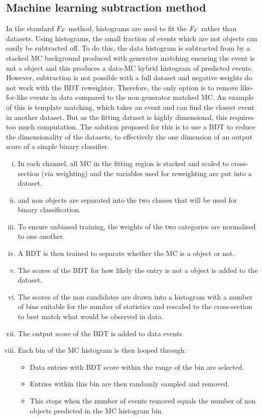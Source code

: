 \subsection{Machine learning subtraction method}

In the standard $F_{F}$ method, histograms are used to fit the $F_{F}$ rather than datasets. 
Using histograms, the small fraction of events which are not \jtth objects can easily be subtracted off. 
To do this, the data histogram is subtracted from by a stacked \ac{MC} background produced with generator matching ensuring the event is not a \jtth object and this produces a data-\ac{MC} hybrid histogram of predicted \jtth events.
However, subtraction is not possible with a full dataset and negative weights do not work with the \ac{BDT} reweighter. 
Therefore, the only option is to remove like-for-like events in data compared to the non \jtth generator matched \ac{MC}.
An example of this is template matching, which takes an event and can find the closest event in another dataset.
But as the fitting dataset is highly dimensional, this requires too much computation.
The solution proposed for this is to use a \ac{BDT} to reduce the dimensionality of the datasets, to effectively the one dimension of an output score of a simple binary classifier. \\

\begin{enumerate}[i)]
  \item In each channel, all \ac{MC} in the fitting region is stacked and scaled to cross-section (via weighting) and the variables used for reweighting are put into a dataset.
  \item \jtth and non \jtth objects are separated into the two classes that will be used for binary classification.
  \item To ensure unbiased training, the weights of the two categories are normalised to one another.
  \item A \ac{BDT} is then trained to separate whether the \ac{MC} is a \jtth object or not.
  \item The scores of the \ac{BDT} for how likely the entry is not a \jtth object is added to the dataset.
  \item The scores of the non \jtth candidates are drawn into a histogram with a number of bins suitable for the number of statistics and rescaled to the cross-section to best match what would be observed in data.
  \item The output score of the \ac{BDT} is added to data events
  \item Each bin of the \ac{MC} histogram is then looped through:
  \begin{itemize}
    \item Data entries with \ac{BDT} score within the range of the bin are selected.
    \item Entries within this bin are then randomly sampled and removed.
    \item This stops when the number of events removed equals the number of non \jtth objects predicted in the \ac{MC} histogram bin.
  \end{itemize}
\end{enumerate} 

